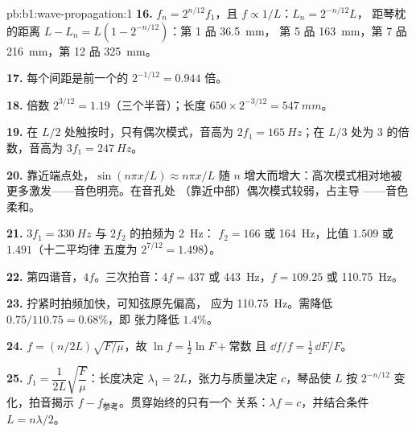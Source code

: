 \begin{solution}{pb:b1:wave-propagation:1}
\textbf{16.} $f_n = 2^{n/12}f_1$，且 $f \propto 1/L$：$L_n = 2^{-n/12}L$，
距琴枕的距离 $L - L_n = L(1 - 2^{-n/12})$：第 1 品 \qty{36.5}{mm}，
第 5 品 \qty{163}{mm}，第 7 品 \qty{216}{mm}，第 12 品 \qty{325}{mm}。

\textbf{17.} 每个间距是前一个的 $2^{-1/12} = 0.944$ 倍。

\textbf{18.} 倍数 $2^{3/12} = 1.19$（三个半音）；长度
$650 \times 2^{-3/12} = \qty{547}{mm}$。

\textbf{19.} 在 $L/2$ 处触按时，只有偶次模式，音高为 $2f_1 =
\qty{165}{Hz}$；在 $L/3$ 处为 $3$ 的倍数，音高为 $3f_1 = \qty{247}{Hz}$。

\textbf{20.} 靠近端点处，$\sin(n\pi x/L) \approx n\pi x/L$ 随
$n$ 增大而增大：高次模式相对地被更多激发——音色明亮。在音孔处
（靠近中部）偶次模式较弱，占主导
——音色柔和。

\textbf{21.} $3f_1 = \qty{330}{Hz}$ 与 $2f_2$ 的拍频为 \qty{2}{Hz}：
$f_2 = 166$ 或 \qty{164}{Hz}，比值 $1.509$ 或 $1.491$（十二平均律
五度为 $2^{7/12} = 1.498$）。

\textbf{22.} 第四谐音，$4f$。三次拍音：$4f = 437$ 或
\qty{443}{Hz}，$f = 109.25$ 或 \qty{110.75}{Hz}。

\textbf{23.} 拧紧时拍频加快，可知弦原先偏高，
应为 \qty{110.75}{Hz}。需降低 $0.75/110.75 = 0.68\%$，即
张力降低 $1.4\%$。

\textbf{24.} $f = (n/2L)\sqrt{F/\mu}$，故 $\ln f = \tfrac12\ln F + \text{常数}$
且 $\dd f/f = \tfrac12\,\dd F/F$。

\textbf{25.} $f_1 = \dfrac{1}{2L}\sqrt{\dfrac{F}{\mu}}$：长度决定
$\lambda_1 = 2L$，张力与质量决定 $c$，琴品使 $L$ 按
$2^{-n/12}$ 变化，拍音揭示 $f - f_{\text{参考}}$。贯穿始终的只有一个
关系：$\lambda f = c$，并结合条件 $L = n\lambda/2$。
\end{solution}
